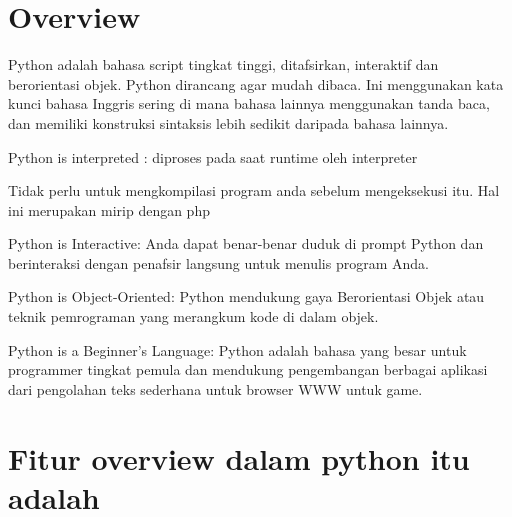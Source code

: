 \section{Overview}
\vspace{14pt}
\noindent 
{\fontsize{14pt}{14pt}\selectfont
Python adalah bahasa script tingkat tinggi, ditafsirkan, interaktif dan berorientasi objek. Python dirancang agar mudah dibaca. Ini menggunakan kata kunci bahasa Inggris sering di mana bahasa lainnya menggunakan tanda baca, dan memiliki konstruksi sintaksis lebih sedikit daripada bahasa lainnya. \par
\vspace{\baselineskip}
\noindent
\noindent 
{\fontsize{14pt}{14pt}\selectfont 
Python is interpreted : diproses pada saat runtime oleh interpreter \par
\vspace{\baselineskip}
\noindent
\noindent 
{\fontsize{14pt}{14pt}\selectfont 
Tidak perlu untuk mengkompilasi program anda sebelum mengeksekusi itu. Hal ini merupakan mirip dengan php \par
\vspace{\baselineskip}
\noindent
\noindent 
{\fontsize{14pt}{14pt}\selectfont 
Python is Interactive: Anda dapat benar-benar duduk di prompt Python dan berinteraksi dengan penafsir langsung untuk menulis program Anda. \par
\vspace{\baselineskip}
\noindent
\noindent
{\fontsize{14pt}{14pt}\selectfont 
Python is Object-Oriented: Python mendukung gaya Berorientasi Objek atau teknik pemrograman yang merangkum kode di dalam objek. \par
\vspace{\baselineskip}
\noindent
\noindent 
{\fontsize{14pt}{14pt}\selectfont 
Python is a Beginner's Language: Python adalah bahasa yang besar untuk programmer tingkat pemula dan mendukung pengembangan berbagai aplikasi dari pengolahan teks sederhana untuk browser WWW untuk game. \par
\vspace{\baselineskip}
\noindent
\noindent 
{\fontsize{14pt}{14pt}\section {Fitur overview dalam python itu adalah}
\vspace{\baselineskip}
\noindent
\noindent 
{\fontsize{14pt}{14pt}\selectfont 
\begin{itemize}
	

\end{itemize}}}}}}}}}
